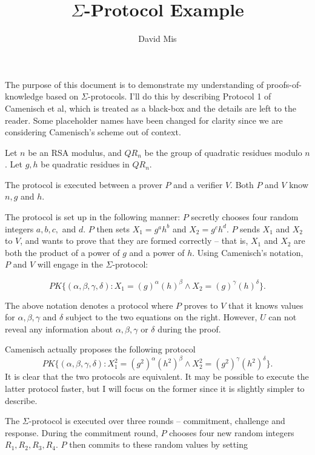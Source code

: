 \documentclass[11pt]{article}
\begin{document}
\title{$\Sigma$-Protocol Example}
\author{David Mis}

\maketitle

The purpose of this document is to demonstrate my understanding of proofs-of-knowledge based on $\Sigma$-protocols. I'll do this by describing Protocol 1 of Camenisch et al, which is treated as a black-box and the details are left to the reader. Some placeholder names have been changed for clarity since we are considering Camenisch's scheme out of context.

Let $n$ be an RSA modulus, and $QR_n$ be the group of quadratic residues modulo $n$. Let $g, h$ be quadratic residues in $QR_n$.

The protocol is executed between a prover $P$ and a verifier $V$. Both $P$ and $V$ know $n, g$ and $h$.

The protocol is set up in the following manner: $P$ secretly chooses four random integers $a, b, c,$ and $d$. $P$ then sets $X_1 = g^{a}h^{b}$ and $X_2 = g^ch^{d}$. $P$ sends $X_1$ and $X_2$ to $V$, and wants to prove that they are formed correctly -- that is, $X_1$ and $X_2$ are both the product of a power of $g$ and a power of $h$. Using Camenisch's notation, $P$ and $V$ will engage in the $\Sigma$-protocol:

\begin{equation}
	PK\{(\alpha,\beta,\gamma,\delta):X_{1} = (g)^\alpha (h)^\beta \wedge X_2 = (g)^\gamma(h)^\delta\}.
\end{equation}

The above notation denotes a protocol where $P$ proves to $V$ that it knows values for $\alpha, \beta, \gamma$ and $\delta$ subject to the two equations on the right. However, $U$ can not reveal any information about $\alpha, \beta, \gamma$ or $\delta$ during the proof.

Camenisch actually proposes the following protocol
\begin{equation}
	PK\{(\alpha,\beta,\gamma,\delta):X_{1}^{2} = (g^2)^\alpha (h^2)^\beta \wedge X_2^{2} = (g^2)^\gamma(h^2)^\delta\}.
\end{equation}
It is clear that the two protocols are equivalent. It may be possible to execute the latter protocol faster, but I will focus on the former since it is slightly simpler to describe.

The $\Sigma$-protocol is executed over three rounds -- commitment, challenge and response. During the commitment round, $P$ chooses four new random integers $R_1, R_2, R_3, R_4$. $P$ then commits to these random values by setting
\end{document}
